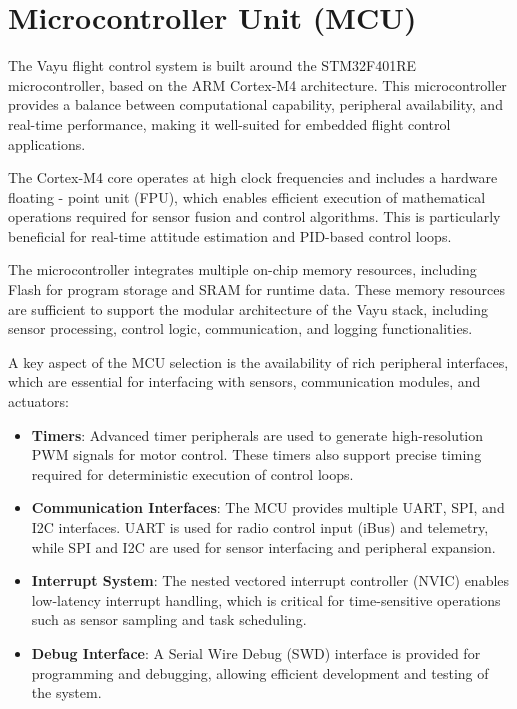 \section{Microcontroller Unit (MCU)}
\label{sec:mcu}

The Vayu flight control system is built around the STM32F401RE microcontroller, based on the ARM Cortex-M4 architecture. This microcontroller provides a balance between computational capability, peripheral availability, and real-time performance, making it well-suited for embedded flight control applications.

The Cortex-M4 core operates at high clock frequencies and includes a hardware floating - point unit (FPU), which enables efficient execution of mathematical operations required for sensor fusion and control algorithms. This is particularly beneficial for real-time attitude estimation and PID-based control loops.

The microcontroller integrates multiple on-chip memory resources, including Flash for program storage and SRAM for runtime data. These memory resources are sufficient to support the modular architecture of the Vayu stack, including sensor processing, control logic, communication, and logging functionalities.

A key aspect of the MCU selection is the availability of rich peripheral interfaces, which are essential for interfacing with sensors, communication modules, and actuators:

\begin{itemize}
    \item \textbf{Timers}:  
    Advanced timer peripherals are used to generate high-resolution PWM signals for motor control. These timers also support precise timing required for deterministic execution of control loops.

    \item \textbf{Communication Interfaces}:  
    The MCU provides multiple UART, SPI, and I2C interfaces. UART is used for radio control input (iBus) and telemetry, while SPI and I2C are used for sensor interfacing and peripheral expansion.

    \item \textbf{Interrupt System}:  
    The nested vectored interrupt controller (NVIC) enables low-latency interrupt handling, which is critical for time-sensitive operations such as sensor sampling and task scheduling.

    \item \textbf{Debug Interface}:  
    A Serial Wire Debug (SWD) interface is provided for programming and debugging, allowing efficient development and testing of the system.
\end{itemize}

